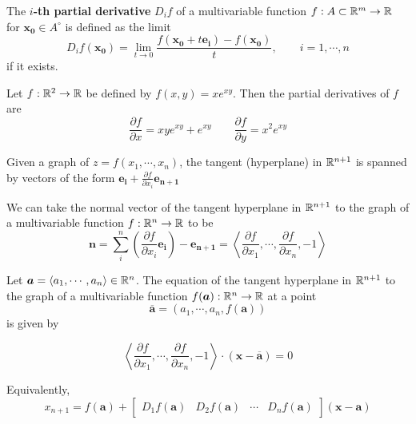 \begin{definition}
    The \textbf{$i$-th partial derivative} $D_if$ of a multivariable function $f : A \subset \mathbb{R}^m \to \mathbb{R}$ for $\bm{x_0} \in A^\circ$ is defined as the limit
    $$D_if(\bm{x_0}) =  \lim_{t \to 0} \frac{f(\bm{x_0}+t\bm{e_i})-f(\bm{x_0})}{t}, \qquad i = 1, \cdots, n$$
    if it exists.
    
    \end{definition}

    \begin{example}
        Let $f: \mathbb{R}^2 \to \mathbb{R}$ be defined by $f(x,y) = xe^{xy}$.  Then the partial derivatives of $f$ are
        $$\frac{\partial f}{\partial x} = xye^{xy} + e^{xy} \qquad \frac{\partial f}{\partial y} = x^2e^{xy}$$
    \end{example}
    

\begin{proposition}
    Given a graph of $z = f(x_1, \cdots, x_n)$, the tangent (hyperplane) in $\mathbb{R}^{n+1}$ is spanned by vectors of the form $\bm{e_i} + \frac{\partial f}{\partial x_i}\bm{e_{n+1}}$
    \end{proposition}
    
    
    \begin{proposition}
    We can take the normal vector of the tangent hyperplane in $\mathbb{R}^{n+1}$ to the graph of a multivariable function $f : \mathbb{R}^n \to \mathbb{R}$ to be 
    $$\bm{n} = \sum_{i}^n \left(\frac{\partial f}{\partial x_i}\bm{e_i}\right) -\bm{e_{n+1}} = \left\langle \frac{\partial f}{\partial x_1}, \cdots, \frac{\partial f}{\partial x_n}, -1\right\rangle $$
    \end{proposition}

    \begin{theorem}
    Let $\bm{a} = \langle a_1, \cdots, a_n \rangle \in \mathbb{R}^n$.  The equation of the tangent hyperplane in $\mathbb{R}^{n+1}$ to the graph of a multivariable function $f(\bm{a}) : \mathbb{R}^n \to \mathbb{R}$ at a point $$\bm{\overline{a}} = (a_1, \cdots, a_n, f(\bm{a}))$$ is given by 
    
    
    $$\left\langle \frac{\partial f}{\partial x_1}, \cdots, \frac{\partial f}{\partial x_n}, -1 \right\rangle \cdot (\bm{x} - \bm{\overline{a}}) = 0$$

    Equivalently, $$x_{n+1} = f(\bm{a}) + \begin{bmatrix}
D_1f(\bm{a}) & D_2f(\bm{a}) & \cdots & D_nf(\bm{a})
\end{bmatrix} (\bm{x} - \bm{a}) $$
    \end{theorem}


